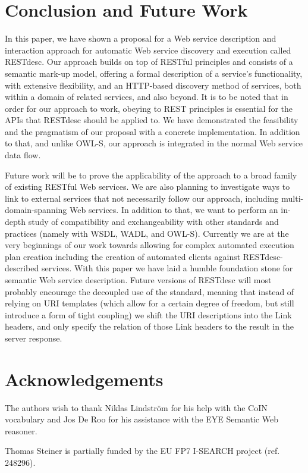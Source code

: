 \documentclass[runningheads,a4paper, twocolumn]{llncs}
\begin{document}
\section{Conclusion and Future Work} \label{sec:conclusion-and-future-work}
In this paper, we have shown a proposal for a Web service description and interaction approach for automatic Web service discovery and execution called RESTdesc. Our approach builds on top of RESTful principles and consists of a semantic mark-up model, offering a formal description of a service's functionality, with extensive flexibility, and an HTTP-based discovery method of services, both within a domain of related services, and also beyond. It is to be noted that in order for our approach to work, obeying to REST principles is essential for the APIs that RESTdesc should be applied to. We have demonstrated the feasibility and the pragmatism of our proposal with a concrete implementation. In addition to that, and unlike OWL-S, our approach is integrated in the normal Web service data flow.

Future work will be to prove the applicability of the approach to a broad family of existing RESTful Web services. We are also planning to investigate ways to link to external services that not necessarily follow our approach, including multi-domain-spanning Web services. In addition to that, we want to perform an in-depth study of compatibility and exchangeability with other standards and practices (namely with WSDL, WADL, and OWL-S). Currently we are at the very beginnings of our work towards allowing for complex automated execution plan creation including the creation of automated clients against RESTdesc-described services. With this paper we have laid a humble foundation stone for semantic Web service description. Future versions of RESTdesc will most probably encourage the decoupled use of the standard, meaning that instead of relying on URI templates (which allow for a certain degree of freedom, but still introduce a form of tight coupling) we shift the URI descriptions into the Link headers, and only specify the relation of those Link headers to the result in the server response.

\section*{Acknowledgements} \label{sec:acknowledgements}
The authors wish to thank Niklas Lindstr\"om for his help with the CoIN vocabulary and Jos De Roo for his assistance with the EYE Semantic Web reasoner.

{Thomas Steiner is partially funded by the EU FP7 I-SEARCH project (ref. 248296).}{}

\renewcommand{\ttdefault}{cmvtt}
\renewcommand\UrlFont\tt



\end{document}
